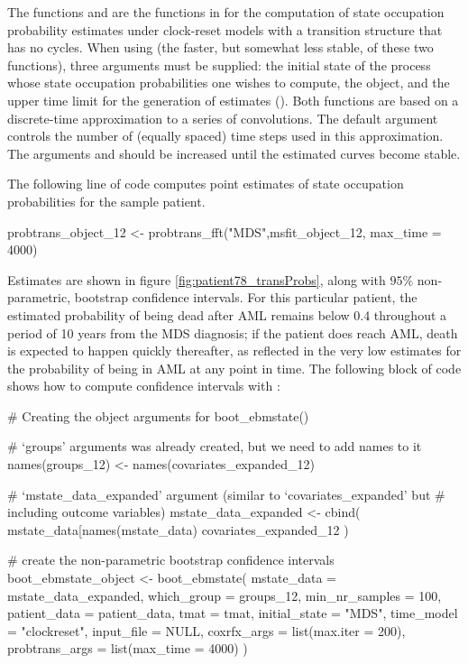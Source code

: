 The functions  and  are the functions in  for the computation of state occupation probability estimates under clock-reset models with a transition structure that has no cycles.  When using  (the faster, but somewhat less stable, of these two functions), three arguments must be supplied: the initial state of the process whose state occupation probabilities one wishes to compute, the  object,  and the upper time limit for the generation of estimates (). Both functions are based on a discrete-time approximation to a series of convolutions. The default argument  controls the number of (equally spaced) time steps used in this approximation. The arguments  and  should be increased until the estimated curves become stable. 

The following line of code computes point estimates of state occupation probabilities for the sample patient. 

\begin{example}
probtrans_object_12 <- probtrans_fft("MDS",msfit_object_12, max_time = 4000)
\end{example}
Estimates are shown in figure \ref{fig:patient78_transProbs}, along with $95\%$ non-parametric, bootstrap confidence intervals. For this particular patient, the estimated probability of being dead after AML remains below 0.4 throughout a period of 10 years from the MDS diagnosis; if the patient does reach AML, death is expected to happen quickly thereafter, as reflected in the very low estimates for the probability of being in AML at any point in time. The following block of code shows how to compute confidence intervals with :

\begin{example}
# Creating the object arguments for boot_ebmstate()

# `groups' arguments was already created, but we need to add names to it
names(groups_12) <- names(covariates_expanded_12)
    
# `mstate_data_expanded' argument (similar to `covariates_expanded' but
# including outcome variables)
mstate_data_expanded <- cbind(
  mstate_data[names(mstate_data) %
  covariates_expanded_12
)

# create the non-parametric bootstrap confidence intervals
boot_ebmstate_object <- boot_ebmstate(
  mstate_data = mstate_data_expanded,
  which_group = groups_12,
  min_nr_samples = 100,
  patient_data = patient_data,
  tmat = tmat,
  initial_state = "MDS",
  time_model = "clockreset",
  input_file = NULL,
  coxrfx_args = list(max.iter = 200),
  probtrans_args = list(max_time = 4000)
)
\end{example}


